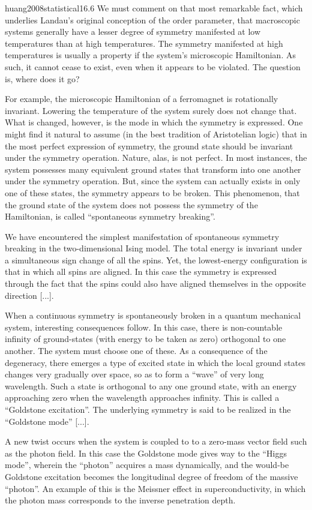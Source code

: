 \begin{cit}{huang2008statistical}{16.6}
    We must comment on that most remarkable fact, which underlies Landau's original conception of the order parameter, that macroscopic systems generally have a lesser degree of symmetry manifested at low temperatures than at high temperatures. The symmetry manifested at high temperatures is usually a property if the system's microscopic Hamiltonian. As such, it cannot cease to exist, even when it appears to be violated. The question is, where does it go?

    For example, the microscopic Hamiltonian of a ferromagnet is rotationally invariant. Lowering the temperature of the system surely does not change that. What is changed, however, is the mode in which the symmetry is expressed. One might find it natural to assume (in the best tradition of Aristotelian logic) that in the most perfect expression of symmetry, the ground state should be invariant under the symmetry operation. Nature, alas, is not perfect. In most instances, the system possesses many equivalent ground states that transform into one another under the symmetry operation. But, since the system can actually exists in only one of these states, the symmetry appears to be broken. This phenomenon, that the ground state of the system does not possess the symmetry of the Hamiltonian, is called ``spontaneous symmetry breaking''.

    We have encountered the simplest manifestation of spontaneous symmetry breaking in the two-dimensional Ising model. The total energy is invariant under a simultaneous sign change of all the spins. Yet, the lowest-energy configuration is that in which all spins are aligned. In this case the symmetry is expressed through the fact that the spins could also have aligned themselves in the opposite direction [...].

    When a continuous symmetry is spontaneously broken in a quantum mechanical system, interesting consequences follow. In this case, there is non-countable infinity of ground-states (with energy to be taken as zero) orthogonal to one another. The system must choose one of these. As a consequence of the degeneracy, there emerges a type of excited state in which the local ground states changes very gradually over space, so as to form a ``wave'' of very long wavelength. Such a state is orthogonal to any one ground state, with an energy approaching zero when the wavelength approaches infinity. This is called a ``Goldstone excitation''. The underlying symmetry is said to be realized in the ``Goldstone mode'' [...].

    A new twist occurs when the system is coupled to to a zero-mass vector field such as the photon field. In this case the Goldstone mode gives way to the ``Higgs mode'', wherein the ``photon'' acquires a mass dynamically, and the would-be Goldstone excitation becomes the longitudinal degree of freedom of the massive ``photon''. An example of this is the Meissner effect in superconductivity, in which the photon mass corresponds to the inverse penetration depth.
\end{cit}

